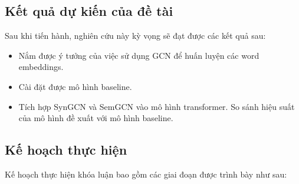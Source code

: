 \documentclass{article}[14pt]
\begin{document}
{    \subsection{Kết quả dự kiến của đề tài}
       
    Sau khi tiến hành, nghiên cứu này kỳ vọng sẽ đạt được các kết quả sau:
    \begin{itemize}
        \item Nắm được ý tưởng của việc sử dụng GCN để huấn luyện các word embeddings.
        \item Cài đặt được mô hình baseline.
        \item Tích hợp SynGCN và SemGCN vào mô hình transformer. So sánh hiệu suất của mô hình đề xuất với mô hình baseline.
    \end{itemize}
    
    \subsection{Kế hoạch thực hiện}
        
    Kế hoạch thực hiện khóa luận bao gồm các giai đoạn được trình bày như sau:

}
\end{document}
